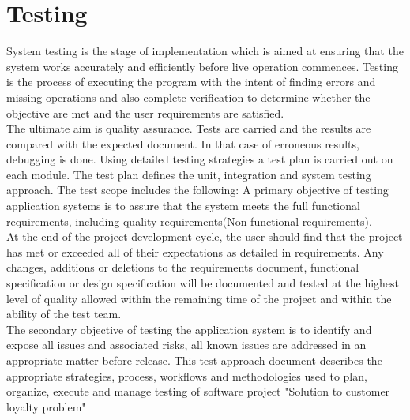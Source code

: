 \chapter{Testing}
\par
System testing is the stage of implementation which is aimed at ensuring that
the system works accurately and efficiently before live operation commences.
Testing is the process of executing the program with the intent of finding
errors and missing operations and also complete verification to determine
whether the objective are met and the user requirements are satisfied.\\

The ultimate aim is quality assurance. Tests are carried and the results are
compared with the expected document. In that case of erroneous results, debugging
is done. Using detailed testing strategies a test plan is carried out on each
module. The test plan defines the unit, integration and system testing approach.
The test scope includes the following: A primary objective of testing
application systems is to assure that the system meets the full functional
requirements, including quality requirements(Non-functional requirements).\\

At the end of the project development cycle, the user should find that the
project has met or exceeded all of their expectations as detailed in
requirements. Any changes, additions or deletions to the requirements document,
functional specification or design specification will be documented and tested
at the highest level of quality allowed within the remaining time of the
project and within the ability of the test team.\\

The secondary objective of testing the application system is to identify and
expose all issues and associated risks, all known issues are
addressed in an appropriate matter before release. This test approach document
describes the appropriate strategies, process, workflows and methodologies
used to plan, organize, execute and manage testing of software project
"Solution to customer loyalty problem"

\newpage

